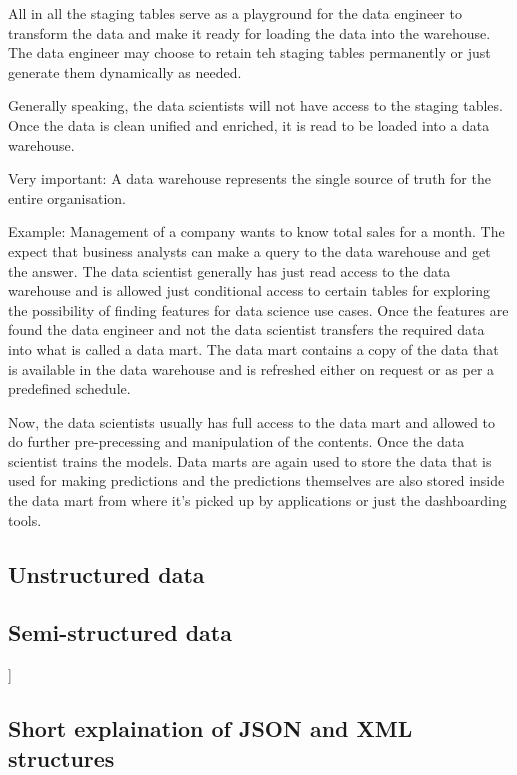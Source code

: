 \documentclass[11pt]{article}
\begin{document}
    All in all the staging tables serve as a playground for the data engineer to transform the data and make it ready for loading the data into the warehouse.
    The data engineer may choose to retain teh staging tables permanently or just generate them dynamically as needed.

    Generally speaking, the data scientists will not have access to the staging tables.
    Once the data is clean unified and enriched, it is read to be loaded into a data warehouse.

    Very important: A data warehouse represents the single source of truth for the entire organisation.

    Example:
    Management of a company wants to know total sales for a month. The expect that business analysts can make a query to the data warehouse and get the answer.
    The data scientist generally has just read access to the data warehouse and is allowed just conditional access to certain tables for exploring the possibility of finding features for data science use cases.
    Once the features are found the data engineer and not the data scientist transfers the required data into what is called a data mart.
    The data mart contains a copy of the data that is available in the data warehouse and is refreshed either on request or as per a predefined schedule.

    Now, the data scientists usually has full access to the data mart and allowed to do further pre-precessing and manipulation of the contents.
    Once the data scientist trains the models.
    Data marts are again used to store the data that is used for making predictions and the predictions themselves are also stored inside the data mart from where it's picked up by applications or just the dashboarding tools.

    \subsection{Unstructured data}

    \subsection{Semi-structured data}]

    \subsection{Short explaination of JSON and XML structures}
    
\end{document}
